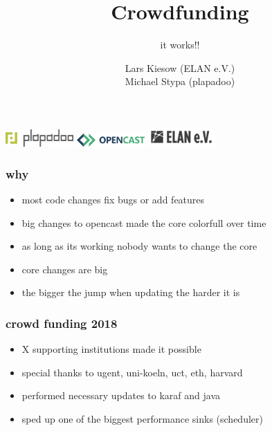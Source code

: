 \documentclass[t,aspectratio=169]{beamer}
\title{Crowdfunding}
\subtitle{it works!!}
\author{Lars Kiesow (ELAN e.V.)\\\vspace{1em}Michael Stypa (plapadoo)}
\begin{document}
\begin{frame}
  \titlepage
  \includegraphics[width=7em]{plapadoo.pdf}
  \hfill
  \includegraphics[width=7em]{opencast.pdf}
  \hfill
  \includegraphics[width=7em]{elan.pdf}
\end{frame}

\begin{frame}[c]
  \frametitle{why}
  \begin{itemize}
    \item most code changes fix bugs or add features
    \item big changes to opencast made the core colorfull over time
    \item as long as its working nobody wants to change the core
    \item core changes are big
    \item the bigger the jump when updating the harder it is
  \end{itemize}
\end{frame}

\begin{frame}[c]
  \frametitle{crowd funding 2018}
  \begin{itemize}
    \item X supporting institutions made it possible
    \item special thanks to ugent, uni-koeln, uct, eth, harvard
  \end{itemize}
  \begin{itemize}
    \item performed necessary updates to karaf and java
    \item sped up one of the biggest performance sinks (scheduler)
  \end{itemize}
\end{frame}

\end{document}
